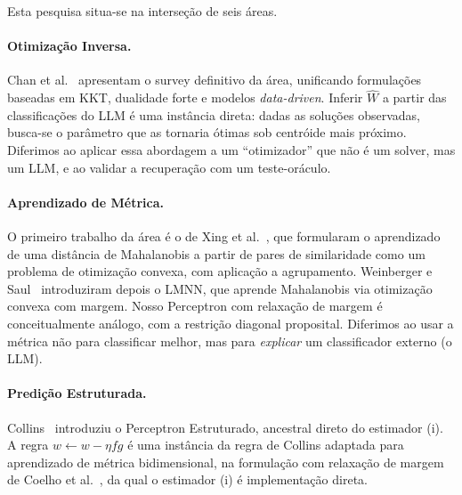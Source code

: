 \documentclass[12pt,a4paper]{article}
\newcommand{\West}{\ensuremath{\hat{W}}}   %
\begin{document}
Esta pesquisa situa-se na interseção de seis áreas.

\paragraph{Otimização Inversa.}
Chan et al.~\cite{chanInverseOptimization2025} apresentam o survey definitivo da área,
unificando formulações baseadas em KKT, dualidade forte e modelos \emph{data-driven}. Inferir
\West{} a partir das classificações do LLM é uma instância direta: dadas as soluções
observadas, busca-se o parâmetro que as tornaria ótimas sob centróide mais próximo. Diferimos
ao aplicar essa abordagem a um ``otimizador'' que não é um solver, mas um LLM, e ao
validar a recuperação com um teste-oráculo.

\paragraph{Aprendizado de Métrica.}
O primeiro trabalho da área é o de Xing et al.~\cite{xingDistanceMetric2002}, que
formularam o aprendizado de uma distância de Mahalanobis a partir de pares de
similaridade como um problema de otimização convexa, com aplicação a agrupamento.
Weinberger e Saul~\cite{weinbergerDistanceMetric2009} introduziram depois o LMNN, que
aprende
Mahalanobis via otimização convexa com margem. Nosso Perceptron com relaxação de margem é
conceitualmente análogo, com a restrição diagonal proposital. Diferimos ao usar a métrica
não para classificar melhor, mas para \emph{explicar} um classificador externo (o LLM).

\paragraph{Predição Estruturada.}
Collins~\cite{collinsDiscriminativeTraining2002} introduziu o Perceptron Estruturado,
ancestral direto do estimador (i). A regra $w \leftarrow w - \eta f g$ é uma instância da
regra de Collins adaptada para aprendizado de métrica bidimensional, na formulação com
relaxação de margem de Coelho et al.~\cite{coelhoPredicaoEstruturada2017}, da qual o
estimador (i) é implementação direta.
\end{document}
